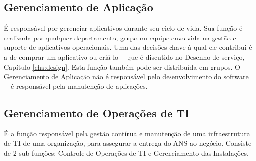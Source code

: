 \subsection{Gerenciamento de Aplicação}
É responsável por gerenciar aplicativos durante seu ciclo de vida. Sua função é
realizada por qualquer departamento, grupo ou equipe envolvida na gestão e
suporte de aplicativos operacionais. Uma das decisões-chave à qual ele
contribui é a de comprar um aplicativo ou criá-lo ---que é discutido no Desenho
de serviço, Capítulo \ref{cha:design}. Esta função também pode ser distribuída
em grupos. O Gerenciamento de Aplicação não é responsável pelo desenvolvimento
do software ---é responsável pela manutenção de aplicações.


\subsection{Gerenciamento de Operações de TI}
É a função responsável pela gestão contínua e manutenção de uma infraestrutura
de TI de uma organização, para assegurar a entrega do ANS ao negócio. Consiste
de 2 sub-funções: Controle de Operações de TI e Gerenciamento das Instalações.
